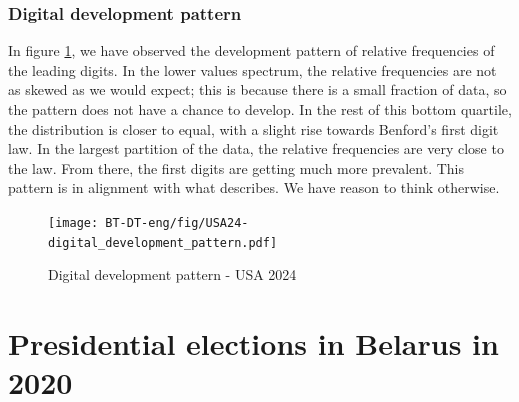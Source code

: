 \newpage

\subsubsection{Digital development pattern}

In figure \ref{fig:USA24-digital_development_pattern}, we have observed the development pattern of relative frequencies of the leading digits. In the lower values spectrum, the relative frequencies are not as skewed as we would expect; this is because there is a small fraction of data, so the pattern does not have a chance to develop. In the rest of this bottom quartile, the distribution is closer to equal, with a slight rise towards Benford's first digit law. In the largest partition of the data, the relative frequencies are very close to the law. From there, the first digits are getting much more prevalent. This pattern is in alignment with what \citeauthor{kossovsky2014benford} describes. We have reason to think otherwise. 

\begin{figure}[h]
    \centering
    \caption{Digital development pattern - USA 2024}
    \texttt{[image: BT-DT-eng/fig/USA24-digital\_development\_pattern.pdf]}
    \label{fig:USA24-digital_development_pattern}
\end{figure}










\newpage 

\section{Presidential elections in Belarus in 2020}

